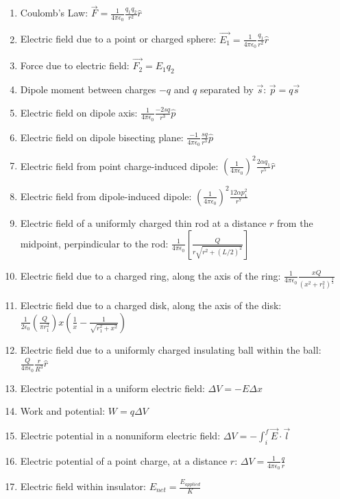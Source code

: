 \documentclass[nobib]{tufte-handout}
\begin{document}
\begin{enumerate}
    \item Coulomb's Law: $\vec{F} = \frac{1}{4\pi \epsilon_0}\frac{q_1 q_2}{r^2}\hat{r}$
    \item Electric field due to a point or charged sphere: $\vec{E_1} = \frac{1}{4\pi \epsilon_0}\frac{q_1}{r^2}\hat{r}$
    \item Force due to electric field: $\vec{F_2} = E_1 q_2$
    \item Dipole moment between charges $-q$ and $q$ separated by $\vec{s}$: $\vec{p} = q\vec{s}$
    \item Electric field on dipole axis: $\frac{1}{4\pi \epsilon_0}\frac{-2sq}{r^3}\hat{p}$
    \item Electric field on dipole bisecting plane: $\frac{-1}{4 \pi \epsilon_0}\frac{sq}{r^3}\hat{p}$
    \item Electric field from point charge-induced dipole: $\left(\frac{1}{4\pi \epsilon_0}\right)^2 \frac{2 \alpha q_1}{r^5}\hat{r}$
    \item Electric field from dipole-induced dipole: $\left(\frac{1}{4\pi \epsilon_0}\right)^2 \frac{12 \alpha p_1^2}{r^7}$
    \item Electric field of a uniformly charged thin rod at a distance $r$ from the midpoint,
    perpindicular to the rod: $\frac{1}{4 \pi \epsilon_0}\left[\frac{Q}{r\sqrt{r^2+(L/2)^2}}\right]$
    \item Electric field due to a charged ring, along the axis of the ring:
    $\frac{1}{4 \pi \epsilon_0}\frac{xQ}{\left(x^{2}+r_{1}^{2}\right)^{\frac{3}{2}}}$
    \item Electric field due to a charged disk, along the axis of the disk:
    $\frac{1}{2 \epsilon_0}\left(\frac{Q}{\pi r_{1}^{2}}\right)x\left(\frac{1}{x}-\frac{1}{\sqrt{r_{1}^{2}+x^{2}}}\right)$
    \item Electric field due to a uniformly charged insulating ball within the ball: 
    $\frac{Q}{4\pi \epsilon_0}\frac{r}{R^3}\hat{r}$
    \item Electric potential in a uniform electric field: $\Delta V = -E\Delta x$
    \item Work and potential: $W = q\Delta V$
    \item Electric potential in a nonuniform electric field: $\Delta V = -\int_{i}^{f} \vec{E} \cdot \vec{l}$
    \item Electric potential of a point charge, at a distance $r$: $\Delta V = \frac{1}{4\pi \epsilon_0}\frac{q}{r}$
    \item Electric field within insulator: $E_{net} = \frac{E_{applied}}{K}$

\end{enumerate}
\end{document}
